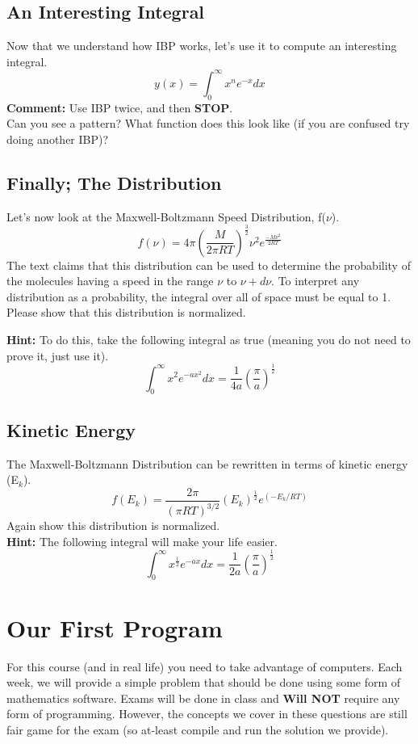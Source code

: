 \documentclass{article}
\newcommand{\be}{\begin{equation}}
\newcommand{\ee}{\end{equation}}
\begin{document}
\subsection{An Interesting Integral}
Now that we understand how IBP works, let's use it to compute an interesting integral. 
\be
y(x) = \int_0^\infty x^{n}e^{-x}dx 
\ee
\textbf{Comment:} Use IBP twice, and then \textbf{STOP}. \\
Can you see a pattern?
What function does this look like (if you are confused try doing another IBP)?

\subsection{Finally; The Distribution}
Let's now look at the Maxwell-Boltzmann Speed Distribution, f($\nu$).
\be
f(\nu) = 4\pi \left(\frac{M}{2\pi RT}\right)^{\frac{3}{2}} \nu^2 e^{\frac{-M\nu^2}{2RT}}
\ee
The text claims that this distribution can be used to determine the probability of the molecules having a speed in the range $\nu$ to $\nu + d\nu$. 
To interpret any distribution as a probability, the integral over all of space must be equal to 1.
Please show that this distribution is normalized. 

\textbf{Hint:} To do this, take the following integral as true (meaning you do not need to prove it, just use it). 
\be
\int_0^\infty x^2 e^{-ax^2} dx = \frac{1}{4a}\left(\frac{\pi}{a}\right)^{\frac{1}{2}}
\ee

\subsection{Kinetic Energy}
The Maxwell-Boltzmann Distribution can be rewritten in terms of kinetic energy (E$_k$). 
\be
f(E_k) = \frac{2\pi}{(\pi RT)^{3/2}} \left(E_k\right)^{\frac{1}{2}} e^{\left(-E_k/RT\right)}
\ee
Again show this distribution is normalized.\\
\textbf{Hint:} The following integral will make your life easier. 
\be
\int_0^\infty x^{\frac{1}{2}} e^{-ax} dx = \frac{1}{2a}\left(\frac{\pi}{a}\right)^{\frac{1}{2}}
\ee

\section{Our First Program}
For this course (and in real life) you  need to take advantage of computers.
Each week, we will provide a simple problem that should be done using some form of mathematics software.
Exams will be done in class and \textbf{ Will NOT} require any form of programming.
However, the concepts we cover in these questions are still fair game for the exam (so at-least compile and run the solution we provide). 
\end{document}
